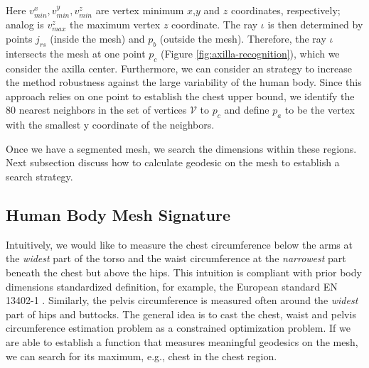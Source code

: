 \documentclass[runningheads, orivec]{llncs}
\begin{document}
Here $v^x_{min}, v^y_{min}, v^z_{min}$ are vertex minimum $x$,$y$ and $z$ 
coordinates, respectively; analog is $v^z_{max}$ the maximum vertex $z$ 
coordinate. The ray 
$\iota$ is then determined by points $j_{rs}$ (inside the mesh) and $p_b$ 
(outside the mesh). Therefore, the ray $\iota$ intersects the mesh at one point 
$p_c$ (Figure \ref{fig:axilla-recognition}), which we consider the axilla 
center. Furthermore, we can consider an strategy to increase the method 
robustness against the large variability of the human body. Since this approach 
relies on one point to establish the chest upper bound, we identify the 80 
nearest neighbors in the set of vertices $\mathcal{V}$ to $p_c$ and define 
$p_a$ to be the vertex with the smallest y coordinate of the neighbors.  

Once we have a segmented mesh, we search the dimensions within 
these regions. Next subsection discuss how to calculate geodesic on the mesh to 
establish a search strategy.


\subsection{Human Body Mesh Signature}\label{subsec:hbm_signature}
Intuitively, we would like to measure the chest circumference below the arms 
at the \textit{widest} part of the torso and the waist circumference at the 
\textit{narrowest} part beneath the chest but above the hips. This intuition is 
compliant 
with prior body dimensions standardized definition, for example, the European 
standard EN 13402-1 \cite{en13402-1}. Similarly, the pelvis 
circumference is measured often around the \textit{widest} part of hips and 
buttocks. The general idea is to cast the chest, waist and pelvis circumference 
estimation problem as a constrained optimization problem. If we are able to 
establish a 
function that measures meaningful geodesics on the mesh, we can search for its 
maximum, 
e.g., chest in the chest region.
\end{document}
